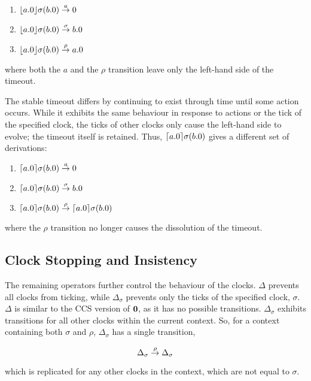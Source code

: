 \begin{enumerate}
\item $\lfloor{a.0}\rfloor {\sigma} ({b.0}) \stackrel{a}{\rightarrow} 0$
\item $\lfloor{a.0}\rfloor {\sigma} ({b.0}) \stackrel{\sigma}{\rightarrow} b.0$
\item $\lfloor{a.0}\rfloor {\sigma} ({b.0}) \stackrel{\rho}{\rightarrow} a.0$
\end{enumerate}

\noindent where both the $a$ and the $\rho$ transition leave only the
left-hand side of the timeout.

The stable timeout differs by continuing to exist through time until
some action occurs.  While it exhibits the same behaviour in response
to actions or the tick of the specified clock, the ticks of other
clocks only cause the left-hand side to evolve; the timeout itself is
retained.  Thus, $\lceil{a.0}\rceil {\sigma} ({b.0})$ gives a different set
of derivations:

\begin{enumerate}
\item $\lceil{a.0}\rceil {\sigma} ({b.0}) \stackrel{a}{\rightarrow} 0$
\item $\lceil{a.0}\rceil {\sigma} ({b.0}) \stackrel{\sigma}{\rightarrow} b.0$
\item $\lceil{a.0}\rceil {\sigma} ({b.0}) \stackrel{\rho}{\rightarrow} \lceil{a.0}\rceil {\sigma} ({b.0})$
\end{enumerate}

\noindent where the $\rho$ transition no longer causes the dissolution
of the timeout.

\subsection{Clock Stopping and Insistency}
\label{clockcontrol}

The remaining operators further control the behaviour of the clocks.
$\Delta$ prevents all clocks from ticking, while $\Delta_{\sigma}$
prevents only the ticks of the specified clock, $\sigma$.  $\Delta$ is
similar to the CCS version of $\textbf{0}$, as it has no possible
transitions.  $\Delta_{\sigma}$ exhibits transitions for all other
clocks within the current context.  So, for a context containing both
$\sigma$ and $\rho$, $\Delta_{\sigma}$ has a single transition,

\begin{equation}
  \Delta_{\sigma} \stackrel{\rho}{\rightarrow} \Delta_{\sigma}
\end{equation}

\noindent which is replicated for any other clocks in the context,
which are not equal to $\sigma$.

